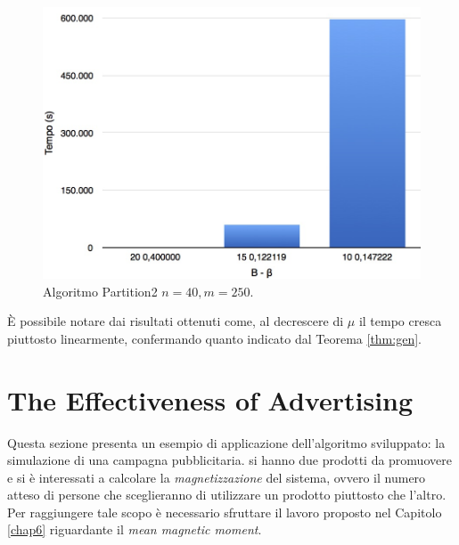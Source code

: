\begin{figure}[h!]
	\vspace*{1cm}
	\centering
	\includegraphics[scale=.3]{img/Bbeta/40_250.jpg}
	\caption{Algoritmo Partition2 $n = 40, m = 250$.}
\end{figure}
È possibile notare dai risultati ottenuti come, al decrescere di $\mu$ il tempo cresca piuttosto linearmente, confermando quanto indicato dal Teorema \ref{thm:gen}.
\clearpage



\section{The Effectiveness of Advertising}
Questa sezione presenta un esempio di applicazione dell'algoritmo sviluppato: la simulazione di una campagna pubblicitaria. si hanno due prodotti da promuovere e si è interessati a calcolare la \textit{magnetizzazione} del sistema, ovvero il numero atteso di persone che sceglieranno di utilizzare un prodotto piuttosto che l'altro. Per raggiungere tale scopo è necessario sfruttare il lavoro proposto nel Capitolo \ref{chap6} riguardante il \textit{mean magnetic moment}.
